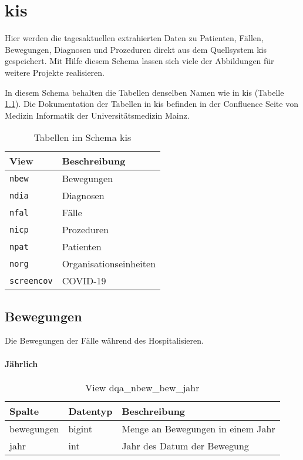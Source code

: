 \chapter{\acs{kis}} \label{chp:kis}

Hier werden die tagesaktuellen extrahierten Daten zu Patienten, Fällen, Bewegungen, Diagnosen und Prozeduren direkt aus dem Quellsystem \ac{kis} gespeichert. Mit Hilfe diesem Schema lassen sich viele der Abbildungen für weitere Projekte realisieren.

In diesem Schema behalten die Tabellen denselben Namen wie in \ac{kis} (Tabelle \ref{tab:schemaKis}). Die Dokumentation der Tabellen in \ac{kis} befinden in der Confluence Seite von Medizin Informatik der Universitätsmedizin Mainz.

\begin{table}[ht]
	\centering   
	\caption{Tabellen im Schema \acs{kis}}
	\label{tab:schemaKis}
	\begin{tabular}{||l|l||}   		
		\hline
		View & Beschreibung \\ [0.5ex]
		\hline\hline
		\texttt{nbew} & Bewegungen \\
		\hline
		\texttt{ndia} & Diagnosen \\
		\hline
		\texttt{nfal} & Fälle \\
		\hline
		\texttt{nicp} & Prozeduren \\
		\hline
		\texttt{npat} & Patienten \\
		\hline
		\texttt{norg} & Organisationseinheiten \\
		\hline
		\texttt{screencov} & COVID-19 \\
		\hline
	\end{tabular}
\end{table}

\section{Bewegungen} \label{sec:beweg}

Die Bewegungen der Fälle während des Hospitalisieren.

\subsubsection{Jährlich} \label{subsubsec:bewJahr}

\clearpage

\begin{table}[ht]
	\centering   
	\caption{View dqa\_nbew\_bew\_jahr}
	\label{tab:beweJahr}
	\begin{tabular}{||l|l|p{10cm}||}   		
		\hline
		Spalte & Datentyp & Beschreibung \\ [0.5ex]
		\hline\hline
		bewegungen & bigint & Menge an Bewegungen in einem Jahr\\
		\hline
		jahr & int &  Jahr des Datum der Bewegung \\
		\hline
		
	\end{tabular}
\end{table}


